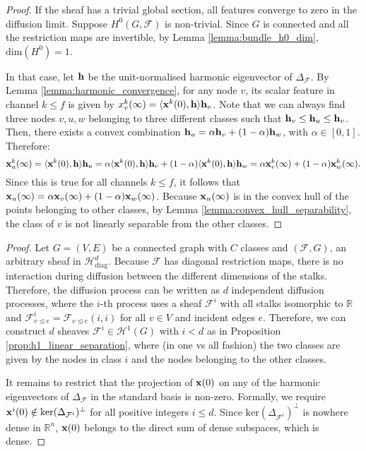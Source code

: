 \documentclass{article}
\def\vh{{\bf{h}}}
\def\vx{{\bf{x}}}
\def\gF{{\mathcal{F}}}
\def\gH{{\mathcal{H}}}
\def\sR{{\mathbb{R}}}
\newcommand{\tleq}{\trianglelefteq}
\begin{document}
\ImpossibleSeparation*
\begin{proof}
If the sheaf has a trivial global section, all features converge to zero in the diffusion limit. Suppose $H^0(G, \gF)$ is non-trivial. Since $G$ is connected and all the restriction maps are invertible, by Lemma \ref{lemma:bundle_h0_dim}, $\mathrm{dim}(H^0) = 1$. 

In that case, let $\vh$ be the unit-normalised harmonic eigenvector of $\Delta_\gF$. By Lemma \ref{lemma:harmonic_convergence}, for any node $v$, its scalar feature in channel $k \leq f$ is given by $x_v^k(\infty) = \langle \vx^k(0), \vh \rangle \vh_v$. Note that we can always find three nodes $v, u, w$ belonging to three different classes such that $\vh_v \leq \vh_u \leq \vh_v$. Then, there exists a convex combination $\vh_u = \alpha \vh_v + (1 - \alpha) \vh_w$, with $\alpha \in [0, 1]$. Therefore:
\begin{equation}
    \vx_u^k(\infty) = \langle \vx^k(0), \vh \rangle \vh_u = \alpha \langle \vx^k(0), \vh \rangle  \vh_v + (1 - \alpha) \langle \vx^k(0), \vh \rangle \vh_w = \alpha \vx^k_v(\infty) + (1 - \alpha) \vx^k_w(\infty).
\end{equation}
Since this is true for all channels $k \leq f$, it follows that $\vx_u(\infty) = \alpha \vx_v(\infty) + (1 - \alpha) \vx_w(\infty)$. Because $\vx_u(\infty)$ is in the convex hull of the points belonging to other classes, by Lemma \ref{lemma:convex_hull_separability}, the class of $v$ is not linearly separable from the other classes.  
\end{proof}

\DiagSeparation*
\begin{proof}
Let $G = (V, E)$ be a connected graph with $C$ classes and $(\gF, G)$, an arbitrary sheaf in $\gH^d_{\mathrm{diag}}$. Because $\gF$ has diagonal restriction maps, there is no interaction during diffusion between the different dimensions of the stalks. Therefore, the diffusion process can be written as $d$ independent diffusion processes, where the $i$-th process uses a sheaf $\gF^i$ with all stalks isomorphic to $\sR$ and $\gF^i_{v \tleq e} = \gF_{v \tleq e}(i, i)$ for all $v \in V$ and incident edges $e$. Therefore, we can construct $d$ sheaves $\gF^i \in \gH^1(G)$ with $i < d$ as in Proposition \ref{prop:h1_linear_separation}, where (in one vs all fashion) the two classes are given by the nodes in class $i$ and the nodes belonging to the other classes. 

It remains to restrict that the projection of $\vx(0)$ on any of the harmonic eigenvectors of $\Delta_\gF$ in the standard basis is non-zero. Formally, we require $\vx^i(0) \notin \mathrm{ker}(\Delta_{\gF^i})^\perp$ for all positive integers $i \leq d$. Since $\mathrm{ker}(\Delta_{\gF^i})^\perp$ is nowhere dense in $\sR^n$, $\vx(0)$ belongs to the direct sum of dense subspaces, which is dense. 
\end{proof}
\end{document}
